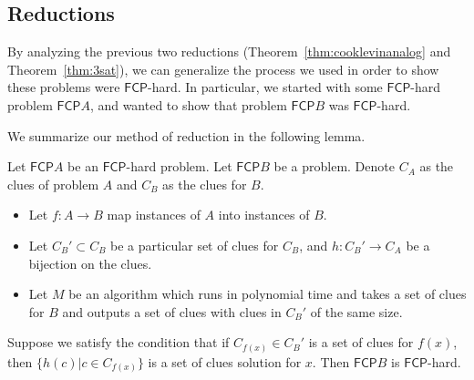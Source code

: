 \documentclass[runningheads,a4paper]{llncs}
\begin{document}
\subsection{Reductions}

By analyzing the previous two reductions (Theorem~\ref{thm:cooklevinanalog} and Theorem~\ref{thm:3sat}), we can generalize the process we used in order to show these problems were $\mathsf{FCP}$-hard. In particular, we started with some $\mathsf{FCP}$-hard problem $\mathsf{FCP} A$, and wanted to show that problem $\mathsf{FCP} B$ was $\mathsf{FCP}$-hard. 

We summarize our method of reduction in the following lemma.
\begin{lemma}
Let $\mathsf{FCP} A$ be an $\mathsf{FCP}$-hard problem. Let $\mathsf{FCP} B$ be a problem. Denote $C_A$ as the clues of problem $A$ and $C_B$ as the clues for $B$.
\begin{itemize} 
\item Let $f: A \rightarrow B$ map instances of $A$ into instances of $B$. 
\item Let $C_B' \subset C_B$ be a particular set of clues for $C_B$, and $h:C_B' \rightarrow C_A$ be a bijection on the clues.
\item Let $M$ be an algorithm which runs in polynomial time and takes a set of clues for $B$ and outputs a set of clues with clues in $C_B'$ of the same size. 
\end{itemize}
Suppose we satisfy the condition that if $C_{f(x)} \in C_B'$ is a set of clues for $f(x)$, then $\{ h(c) | c \in C_{f(x)}\}$ is a set of clues solution for $x$. Then $\mathsf{FCP} B$ is $\mathsf{FCP}$-hard. 
\end{lemma}
\end{document}
